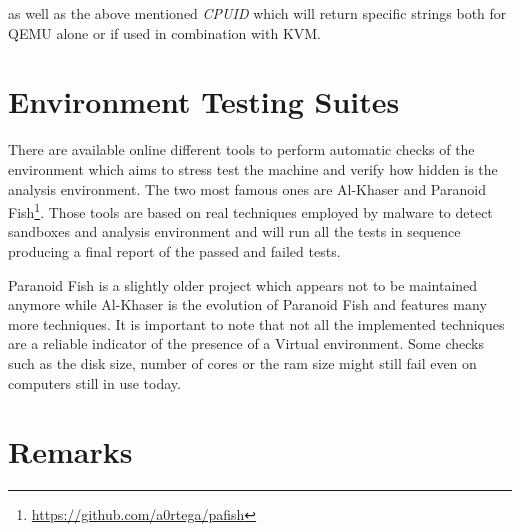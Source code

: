 as well as the above mentioned \textit{CPUID} which will return specific strings both for QEMU alone or if used in combination with KVM.


\section{Environment Testing Suites}


There are available online different tools to perform automatic checks of the environment which aims to stress test the machine and verify how hidden is the analysis environment. The two most famous ones are Al-Khaser and Paranoid Fish\footnote{\url{https://github.com/a0rtega/pafish}}. Those tools are based on real techniques employed by malware to detect sandboxes and analysis environment and will run all the tests in sequence producing a final report of the passed and failed tests.

Paranoid Fish is a slightly older project which appears not to be maintained anymore while Al-Khaser is the evolution of Paranoid Fish and features many more techniques. It is important to note that not all the implemented techniques are a reliable indicator of the presence of a Virtual environment. Some checks such as the disk size, number of cores or the ram size might still fail even on computers still in use today. 


\section{Remarks}
